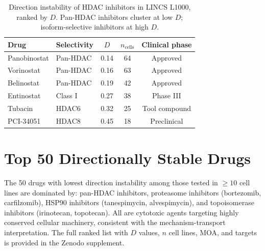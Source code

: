\documentclass[11pt]{article}
\begin{document}
\begin{table}[h]
\centering
\caption{Direction instability of HDAC inhibitors in LINCS L1000, ranked
by $D$. Pan-HDAC inhibitors cluster at low $D$; isoform-selective
inhibitors at high $D$.}
\begin{tabular}{llccc}
\toprule
Drug & Selectivity & $D$ & $n_{\text{cells}}$ & Clinical phase \\
\midrule
Panobinostat & Pan-HDAC & 0.14 & 64 & Approved \\
Vorinostat & Pan-HDAC & 0.16 & 63 & Approved \\
Belinostat & Pan-HDAC & 0.19 & 42 & Approved \\
Entinostat & Class I & 0.27 & 38 & Phase III \\
Tubacin & HDAC6 & 0.32 & 25 & Tool compound \\
PCI-34051 & HDAC8 & 0.45 & 18 & Preclinical \\
\bottomrule
\end{tabular}
\end{table}

\section{Top 50 Directionally Stable Drugs}
\label{app:top50}

The 50 drugs with lowest direction instability among those tested in
$\geq 10$ cell lines are dominated by: pan-HDAC inhibitors,
proteasome inhibitors (bortezomib, carfilzomib), HSP90 inhibitors
(tanespimycin, alvespimycin), and topoisomerase inhibitors (irinotecan,
topotecan). All are cytotoxic agents targeting highly conserved cellular
machinery, consistent with the mechanism-transport interpretation.
The full ranked list with $D$ values, $n$ cell lines, MOA, and targets
is provided in the Zenodo supplement.
\end{document}
